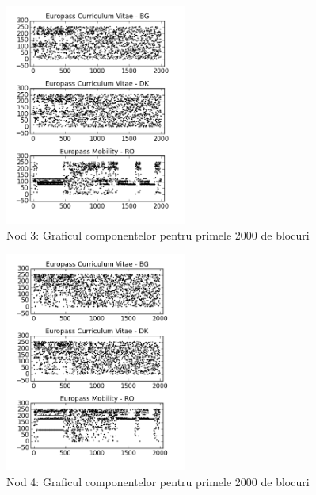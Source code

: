 \documentclass[oneside, 12pt]{book}
\begin{document}
\begin{figure}[b!]
\begin{center}
\includegraphics[width=0.53\textwidth]{img/db3.png}    %
\caption{Nod 3: Graficul componentelor pentru primele 2000 de blocuri} 
\label{fig:db3}
\end{center}
\end{figure}

\begin{figure}[t!]
\begin{center}
\includegraphics[width=0.53\textwidth]{img/db4.png}    %
\caption{Nod 4: Graficul componentelor pentru primele 2000 de blocuri} 
\label{fig:db4}
\end{center}
\end{figure}
\end{document}
